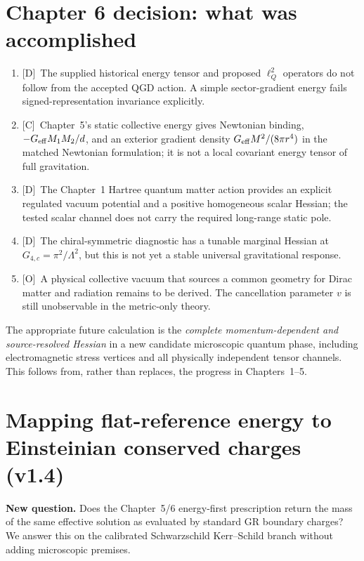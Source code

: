 \documentclass[11pt,a4paper]{article}
\theoremstyle{definition}\newtheorem{definition}[theorem]{Definition}
\theoremstyle{remark}\newtheorem{remark}[theorem]{Remark}
\newcommand{\Dtag}{\textsf{[D]}}
\newcommand{\Ctag}{\textsf{[C]}}
\newcommand{\Otag}{\textsf{[O]}}
\begin{document}
\section{Chapter 6 decision: what was accomplished}
\label{sec:energydecision}
\begin{enumerate}
\item \Dtag\ The supplied historical energy tensor and proposed $\ell_Q^2$ operators do not follow from the accepted QGD action. A simple sector-gradient energy fails signed-representation invariance explicitly.
\item \Ctag\ Chapter~5's static collective energy gives Newtonian binding, $-G_{\rm eff}M_1M_2/d$, and an exterior gradient density $G_{\rm eff}M^2/(8\pi r^4)$ in the matched Newtonian formulation; it is not a local covariant energy tensor of full gravitation.
\item \Dtag\ The Chapter~1 Hartree quantum matter action provides an explicit regulated vacuum potential and a positive homogeneous scalar Hessian; the tested scalar channel does not carry the required long-range static pole.
\item \Dtag\ The chiral-symmetric diagnostic has a tunable marginal Hessian at $G_{4,c}=\pi^2/\Lambda^2$, but this is not yet a stable universal gravitational response.
\item \Otag\ A physical collective vacuum that sources a common geometry for Dirac matter and radiation remains to be derived. The cancellation parameter $v$ is still unobservable in the metric-only theory.
\end{enumerate}
The appropriate future calculation is the \emph{complete momentum-dependent and source-resolved Hessian} in a new candidate microscopic quantum phase, including electromagnetic stress vertices and all physically independent tensor channels. This follows from, rather than replaces, the progress in Chapters~1--5.






\section{Mapping flat-reference energy to Einsteinian conserved charges (v1.4)}
\label{sec:v14-mapping}
\textbf{New question.} Does the Chapter~5/6 energy-first prescription
return the mass of the same effective solution as evaluated by standard
GR boundary charges? We answer this on the calibrated Schwarzschild
Kerr--Schild branch without adding microscopic premises.
\end{document}
